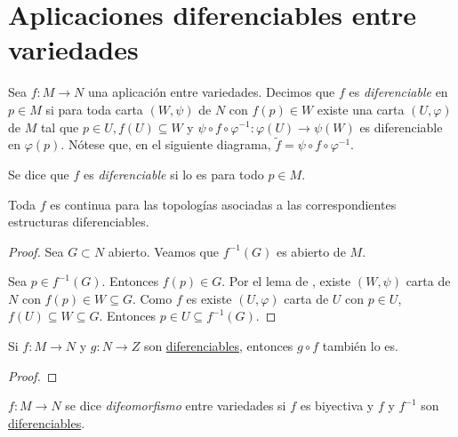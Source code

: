 \documentclass[../VD.tex]{subfiles}
\begin{document}
\setcounter{chapter}{1}
\chapter{Aplicaciones diferenciables entre variedades}
\label{chap:app}

\begin{definition}[diferenciable]
  \label{def:diferenciable}
  Sea \(f \colon M \to N\) una aplicación entre variedades. Decimos que \(f\) es
  \emph{diferenciable} en \(p \in M\) si para toda carta \((W,\psi)\) de \(N\) con \(f(p)
  \in W\) existe una carta \((U,\varphi)\) de \(M\) tal que \(p \in U, f(U)
  \subseteq W\) y \(\psi \circ f \circ \varphi^{-1} \colon \varphi(U) \to
  \psi(W)\) es diferenciable en \(\varphi(p)\). Nótese que, en el siguiente
  diagrama, \(\widetilde{f} = \psi \circ f \circ \varphi^{-1}\).

  Se dice que \(f\) es \emph{diferenciable} si lo es para todo \(p \in M\).

  \begin{figure}[h]
    \centering
  \end{figure}
\end{definition}

\begin{lemma}
  Toda \(f\)  es continua para las topologías
  asociadas a las correspondientes estructuras diferenciables.
\end{lemma}

\begin{proof}
  Sea \(G \subset N\) abierto. Veamos que \(f^{-1}(G)\) es abierto de \(M\).

  Sea \(p \in f^{-1}(G)\). Entonces \(f(p) \in G\). Por el
  lema de , existe
  \((W,\psi)\) carta de \(N\) con \(f(p) \in W \subseteq G\). Como \(f\) es
   existe \((U,\varphi)\) carta de \(U\) con \(p \in
  U\), \(f(U) \subseteq W \subseteq G\). Entonces \(p \in U \subseteq
  f^{-1}(G)\). 
\end{proof}

\begin{lemma}
  Si \(f \colon M \to N\) y \(g \colon N \to Z\) son
  \hyperref[def:diferenciable]{diferenciables}, entonces \(g \circ f\) también
  lo es.
\end{lemma}

\begin{proof}
\end{proof}

\begin{definition}[difeomorfismo]
  \label{def:difeomorfismo}
  \(f \colon M \to N\) se dice \emph{difeomorfismo} entre variedades si \(f\) es
  biyectiva y \(f\) y \(f^{-1}\) son \hyperref[def:diferenciable]{diferenciables}.
\end{definition}
\end{document}
